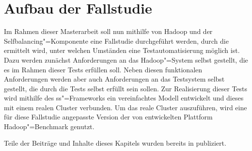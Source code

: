 \chapter{Aufbau der Fallstudie}
\label{sec:fallstudie}

Im Rahmen dieser Masterarbeit soll nun mithilfe von Hadoop und der Selfbalancing"=Komponente eine Fallstudie durchgeführt werden, durch die ermittelt wird, unter welchen Umständen eine Testautomatisierung möglich ist.
Dazu werden zunächst Anforderungen an das Hadoop"=System selbst gestellt, die es im Rahmen dieser Tests erfüllen soll.
Neben diesen funktionalen Anforderungen werden aber auch Anforderungen an das Testsystem selbst gestellt, die durch die Tests selbst erfüllt sein sollen.
Zur Realisierung dieser Tests wird mithilfe des \ac{ss}"=Frameworks ein vereinfachtes Modell entwickelt und dieses mit einem realen Cluster verbunden.
Um das reale Cluster auszuführen, wird eine für diese Fallstudie angepasste Version der von \citeauthor{zhang2016} entwickelten Plattform Hadoop"=Benchmark genutzt.

Teile der Beiträge und Inhalte dieses Kapitels wurden bereits in \cite{Eberhardinger2018} publiziert.





